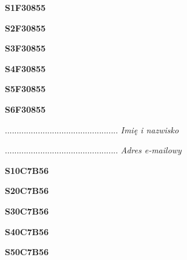 \begin{turn}{90}\huge \textbf{S1F30855}\end{turn}

\begin{turn}{90}\huge \textbf{S2F30855}\end{turn}

\begin{turn}{90}\huge \textbf{S3F30855}\end{turn}

\begin{turn}{90}\huge \textbf{S4F30855}\end{turn}

\begin{turn}{90}\huge \textbf{S5F30855}\end{turn}

\begin{turn}{90}\huge \textbf{S6F30855}\end{turn}

\begin{turn}{90}\begin{minipage}{\linewidth} \vspace{20mm} ................................................  \textit{Imię i nazwisko}\end{minipage}\end{turn}

\begin{turn}{90}\begin{minipage}{\linewidth} \vspace{20mm} ................................................  \textit{Adres e-mailowy}\end{minipage}\end{turn}

\begin{turn}{90}\huge \textbf{S10C7B56}\end{turn}

\begin{turn}{90}\huge \textbf{S20C7B56}\end{turn}

\begin{turn}{90}\huge \textbf{S30C7B56}\end{turn}

\begin{turn}{90}\huge \textbf{S40C7B56}\end{turn}

\begin{turn}{90}\huge \textbf{S50C7B56}\end{turn}

